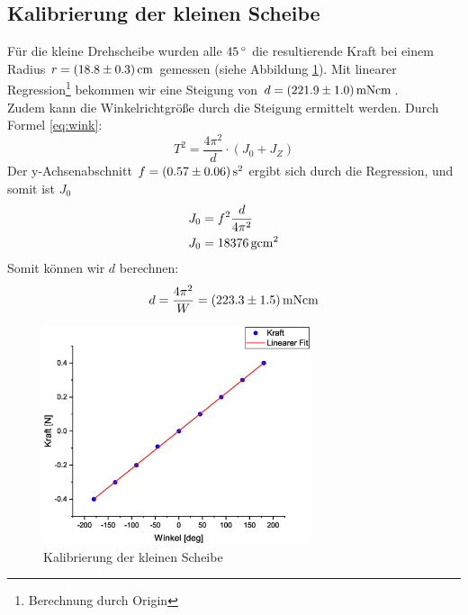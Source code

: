 \subsection{Kalibrierung der kleinen Scheibe}
Für die kleine Drehscheibe wurden alle $\unit[45]{^\circ}$ die resultierende Kraft bei einem Radius $r = \unit[(18.8 \pm 0.3)]{cm}$ gemessen (siehe Abbildung \ref{fig:kal1}). Mit linearer Regression\footnote{Berechnung durch Origin} bekommen wir eine Steigung von $d = \unit[(221.9 \pm 1.0)]{mN cm}$.\\
Zudem kann die Winkelrichtgröße durch die Steigung ermittelt werden. Durch Formel \ref{eq:wink}:
\begin{equation}
T^2 = \frac{4\pi^2}{d}\cdot (J_0+J_Z)
\end{equation}
Der y-Achsenabschnitt $f = \unit[(0.57 \pm 0.06)]{s^2}$ ergibt sich durch die Regression, und somit ist $J_0$
\begin{align}
J_0 &= f^2\frac{d}{4\pi^2}\\
J_0 &= \unit[18376]{g cm^2}
\end{align}
Somit können wir $d$ berechnen:
\begin{equation*}
d = \frac{4\pi^2}{W} = \unit[(223.3 \pm 1.5)]{mN cm}
\end{equation*}


\begin{figure}
\begin{center}
\includegraphics[width=0.7\textwidth]{Bilder/kal1.eps}
\caption{Kalibrierung der kleinen Scheibe}
\label{fig:kal1}
\end{center}
\end{figure}